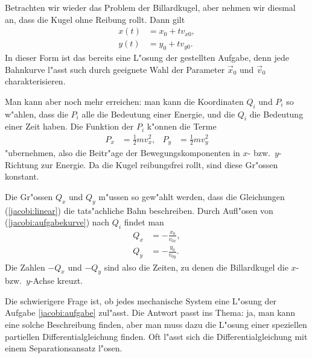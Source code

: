 \begin{beispiel}
Betrachten wir wieder das Problem der Billardkugel, aber nehmen wir
diesmal an, dass die Kugel ohne Reibung rollt. Dann gilt
\begin{equation}
\begin{aligned}
x(t)&=x_0 + tv_{x0},\\
y(t)&=y_0 + tv_{y0}.
\end{aligned}
\label{jacobi:linear}
\end{equation}
In dieser Form ist das bereits eine L"osung der gestellten Aufgabe,
denn jede Bahnkurve l"asst such durch geeignete Wahl der
Parameter $\vec x_0$ und $\vec v_0$ charakterisieren.

Man kann aber noch mehr erreichen: man kann die Koordinaten $Q_i$ und $P_i$
so w"ahlen, dass die $P_i$ alle die Bedeutung einer Energie,
und die $Q_i$ die Bedeutung einer Zeit haben.
Die Funktion der $P_i$ k"onnen die Terme
\begin{equation*}
\begin{aligned}
P_x&=\frac12mv_x^2,&
P_y&=\frac12mv_y^2
\end{aligned}
\end{equation*}
"ubernehmen, also die Beitr"age der Bewegungskomponenten in $x$-
bzw.~$y$-Richtung zur Energie. Da die Kugel reibungsfrei rollt, sind
diese Gr"ossen konstant.

Die Gr"ossen $Q_x$ und $Q_y$ m"ussen so gew"ahlt werden, dass 
die Gleichungen (\ref{jacobi:linear}) die tats"achliche Bahn beschreiben.
Durch Aufl"osen von (\ref{jacobi:aufgabekurve}) nach $Q_i$ findet man
\begin{equation*}
\begin{aligned}
Q_x&=-\frac{x_0}{v_{0x}},\\
Q_y&=-\frac{y_0}{v_{0y}}.
\end{aligned}
\end{equation*}
Die Zahlen $-Q_x$ und $-Q_y$ sind also die Zeiten, zu denen die
Billardkugel die $x$- bzw.~$y$-Achse kreuzt.
\end{beispiel}

Die schwierigere Frage ist, ob jedes mechanische System eine
L"osung der Aufgabe \ref{jacobi:aufgabe} zul"asst.
Die Antwort passt ins Thema: ja, man kann eine solche Beschreibung
finden, aber man muss dazu die L"osung einer speziellen
partiellen Differentialgleichung finden. Oft l"asst sich die
Differentialgleichung mit einem Separationsansatz l"osen.

